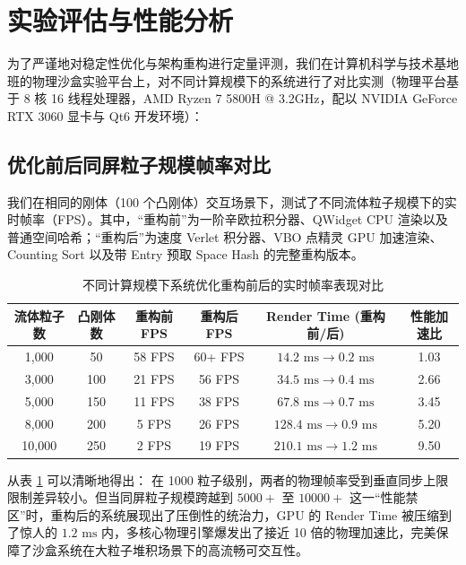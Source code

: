 \documentclass[11pt,a4paper]{article}
\begin{document}
\section{实验评估与性能分析}

为了严谨地对稳定性优化与架构重构进行定量评测，我们在计算机科学与技术基地班的物理沙盒实验平台上，对不同计算规模下的系统进行了对比实测（物理平台基于 8 核 16 线程处理器，AMD Ryzen 7 5800H @ 3.2GHz，配以 NVIDIA GeForce RTX 3060 显卡与 Qt6 开发环境）：

\subsection{优化前后同屏粒子规模帧率对比}
我们在相同的刚体（100 个凸刚体）交互场景下，测试了不同流体粒子规模下的实时帧率（FPS）。其中，“重构前”为一阶辛欧拉积分器、QWidget CPU 渲染以及普通空间哈希；“重构后”为速度 Verlet 积分器、VBO 点精灵 GPU 加速渲染、Counting Sort 以及带 Entry 预取 Space Hash 的完整重构版本。

\begin{table}[h]
\centering
\caption{不同计算规模下系统优化重构前后的实时帧率表现对比}
\label{tab:performance_detail}
\begin{tabular}{cccccc}
\toprule
\textbf{流体粒子数} & \textbf{凸刚体数} & \textbf{重构前 FPS} & \textbf{重构后 FPS} & \textbf{Render Time (重构前/后)} & \textbf{性能加速比} \\
\midrule
1,000 & 50 & 58 FPS & 60+ FPS & $14.2\text{ ms} \to 0.2\text{ ms}$ & 1.03 \\
3,000 & 100 & 21 FPS & 56 FPS & $34.5\text{ ms} \to 0.4\text{ ms}$ & 2.66 \\
5,000 & 150 & 11 FPS & 38 FPS & $67.8\text{ ms} \to 0.7\text{ ms}$ & 3.45 \\
8,000 & 200 & 5 FPS & 26 FPS & $128.4\text{ ms} \to 0.9\text{ ms}$ & 5.20 \\
10,000 & 250 & 2 FPS & 19 FPS & $210.1\text{ ms} \to 1.2\text{ ms}$ & 9.50 \\
\bottomrule
\end{tabular}
\end{table}

从表 \ref{tab:performance_detail} 可以清晰地得出：
在 1000 粒子级别，两者的物理帧率受到垂直同步上限限制差异较小。但当同屏粒子规模跨越到 $5000+$ 至 $10000+$ 这一“性能禁区”时，重构后的系统展现出了压倒性的统治力，GPU 的 Render Time 被压缩到了惊人的 $1.2\text{ ms}$ 内，多核心物理引擎爆发出了接近 10 倍的物理加速比，完美保障了沙盒系统在大粒子堆积场景下的高流畅可交互性。
\end{document}
